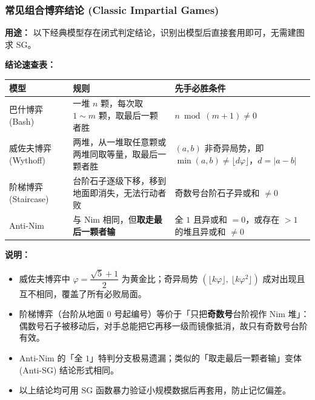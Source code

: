 \subsubsection{常见组合博弈结论 (Classic Impartial Games)}

\textbf{用途：}  
以下经典模型存在闭式判定结论，识别出模型后直接套用即可，无需建图求 SG。

\textbf{结论速查表：}

\begin{center}
\begin{tabularx}{\textwidth}{|l|X|X|}
\hline
\textbf{模型} & \textbf{规则} & \textbf{先手必胜条件} \\ \hline
巴什博弈 (Bash) & 一堆 $n$ 颗，每次取 $1\sim m$ 颗，取最后一颗者胜 & $n \bmod (m+1) \ne 0$ \\ \hline
威佐夫博弈 (Wythoff) & 两堆，从一堆取任意颗或两堆同取等量，取最后一颗者胜 & $(a,b)$ 非奇异局势，即 $\min(a,b) \ne \lfloor d\varphi \rfloor$，$d=|a-b|$ \\ \hline
阶梯博弈 (Staircase) & 台阶石子逐级下移，移到地面即消失，无法行动者败 & 奇数号台阶石子异或和 $\ne 0$ \\ \hline
Anti-Nim & 与 Nim 相同，但\textbf{取走最后一颗者输} & 全 $1$ 且异或和 $=0$，或存在 $>1$ 的堆且异或和 $\ne 0$ \\ \hline
\end{tabularx}
\end{center}

\textbf{说明：}
\begin{itemize}
    \item 威佐夫博弈中 $\varphi=\dfrac{\sqrt5+1}{2}$ 为黄金比；奇异局势 $(\lfloor k\varphi\rfloor,\ \lfloor k\varphi^2\rfloor)$ 成对出现且互不相同，覆盖了所有必败局面。
    \item 阶梯博弈（台阶从地面 $0$ 号起编号）等价于「只把\textbf{奇数号}台阶视作 Nim 堆」：偶数号石子被移动后，对手总能把它再移一级而镜像抵消，故只有奇数号台阶有效。
    \item Anti-Nim 的「全 $1$」特判分支极易遗漏；类似的「取走最后一颗者输」变体 (Anti-SG) 结论形式相同。
    \item 以上结论均可用 SG 函数暴力验证小规模数据后再套用，防止记忆偏差。
\end{itemize}


